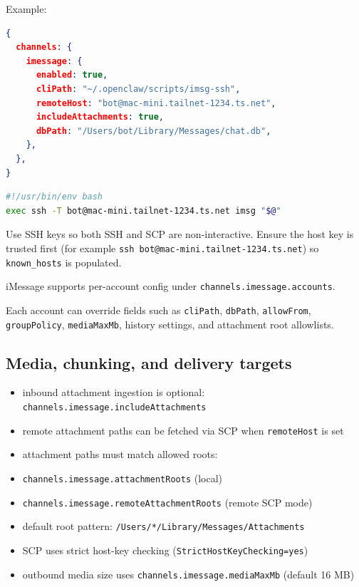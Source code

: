 Example:

\begin{lstlisting}[language=json]
{
  channels: {
    imessage: {
      enabled: true,
      cliPath: "~/.openclaw/scripts/imsg-ssh",
      remoteHost: "bot@mac-mini.tailnet-1234.ts.net",
      includeAttachments: true,
      dbPath: "/Users/bot/Library/Messages/chat.db",
    },
  },
}
\end{lstlisting}


\begin{lstlisting}[language=bash]
#!/usr/bin/env bash
exec ssh -T bot@mac-mini.tailnet-1234.ts.net imsg "$@"
\end{lstlisting}


Use SSH keys so both SSH and SCP are non-interactive.
Ensure the host key is trusted first (for example \texttt{ssh bot@mac-mini.tailnet-1234.ts.net}) so \texttt{known\_hosts} is populated.


iMessage supports per-account config under \texttt{channels.imessage.accounts}.

Each account can override fields such as \texttt{cliPath}, \texttt{dbPath}, \texttt{allowFrom}, \texttt{groupPolicy}, \texttt{mediaMaxMb}, history settings, and attachment root allowlists.


\subsection{Media, chunking, and delivery targets}


\begin{itemize}
  \item inbound attachment ingestion is optional: \texttt{channels.imessage.includeAttachments}
  \item remote attachment paths can be fetched via SCP when \texttt{remoteHost} is set
  \item attachment paths must match allowed roots:
  \item \texttt{channels.imessage.attachmentRoots} (local)
  \item \texttt{channels.imessage.remoteAttachmentRoots} (remote SCP mode)
  \item default root pattern: \texttt{/Users/*/Library/Messages/Attachments}
  \item SCP uses strict host-key checking (\texttt{StrictHostKeyChecking=yes})
  \item outbound media size uses \texttt{channels.imessage.mediaMaxMb} (default 16 MB)
\end{itemize}


